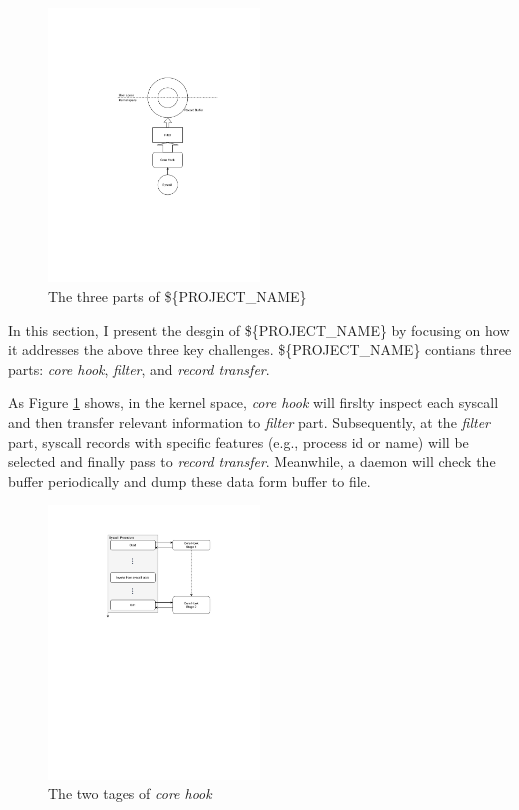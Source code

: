 \begin{figure}
    \centering
    \includegraphics[width=0.5\textwidth]{figures/arch.pdf}
    \caption{The three parts of \$\{PROJECT\_NAME\}}
    \label{fig:arch}
\end{figure}




In this section, I present the desgin of \$\{PROJECT\_NAME\} by focusing on how it addresses the above three key challenges. \$\{PROJECT\_NAME\} contians three parts: \textit{core hook}, \textit{filter}, and \textit{record transfer}. 

As Figure \ref{fig:arch} shows, in the kernel space, \textit{core hook} will firslty inspect each syscall and then transfer relevant information to \textit{filter} part. Subsequently, at the \textit{filter} part, syscall records with specific features (e.g., process id or name) will be selected and finally pass to \textit{record transfer}. Meanwhile, a daemon will check the buffer periodically and dump these data form buffer to file.

\begin{figure}
    \centering
    \includegraphics[width=0.5\textwidth]{figures/core-hook-desgin.pdf}
    \caption{The two tages of \textit{core hook}}
    \label{fig:core-hook-desgin}
\end{figure}


